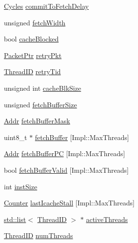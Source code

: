 \begin{DoxyCompactItemize}
\hyperlink{classCycles}{Cycles} \hyperlink{classDefaultFetch_a4b0344f5703ba5770b42602c6df63340}{commitToFetchDelay}
\item 
unsigned \hyperlink{classDefaultFetch_a89b5ed63a2dba82556b909f343319416}{fetchWidth}
\item 
bool \hyperlink{classDefaultFetch_a12a8dc8b9e94659a01ff979d9d98be89}{cacheBlocked}
\item 
\hyperlink{classPacket}{PacketPtr} \hyperlink{classDefaultFetch_a314ae93c04b3ca96e79e1b1f39a8e478}{retryPkt}
\item 
\hyperlink{base_2types_8hh_ab39b1a4f9dad884694c7a74ed69e6a6b}{ThreadID} \hyperlink{classDefaultFetch_a865aaad70625f17392c717930860d386}{retryTid}
\item 
unsigned int \hyperlink{classDefaultFetch_a37c69cb65c303fc6e66984fef13f18c6}{cacheBlkSize}
\item 
unsigned \hyperlink{classDefaultFetch_ac47806923c3481b83636c4aa03d184f8}{fetchBufferSize}
\item 
\hyperlink{base_2types_8hh_af1bb03d6a4ee096394a6749f0a169232}{Addr} \hyperlink{classDefaultFetch_a9fb9a70efc5e29795473f1f92c082063}{fetchBufferMask}
\item 
uint8\_\-t $\ast$ \hyperlink{classDefaultFetch_a924f2775385b2e5ac3008db4b8305c2b}{fetchBuffer} \mbox{[}Impl::MaxThreads\mbox{]}
\item 
\hyperlink{base_2types_8hh_af1bb03d6a4ee096394a6749f0a169232}{Addr} \hyperlink{classDefaultFetch_ab4b128217e67bdf9f6a98420b82cacb9}{fetchBufferPC} \mbox{[}Impl::MaxThreads\mbox{]}
\item 
bool \hyperlink{classDefaultFetch_ab6845c7b94805ded9ea7d94b210be51b}{fetchBufferValid} \mbox{[}Impl::MaxThreads\mbox{]}
\item 
int \hyperlink{classDefaultFetch_a494a9a986bc62c946604f9e9047ad237}{instSize}
\item 
\hyperlink{base_2types_8hh_ae1475755791765b8e6f6a8bb091e273e}{Counter} \hyperlink{classDefaultFetch_a1848d938e5258a2a79298169e43efde5}{lastIcacheStall} \mbox{[}Impl::MaxThreads\mbox{]}
\item 
\hyperlink{classstd_1_1list}{std::list}$<$ \hyperlink{base_2types_8hh_ab39b1a4f9dad884694c7a74ed69e6a6b}{ThreadID} $>$ $\ast$ \hyperlink{classDefaultFetch_af6eaea53db532812052f71bf0380dab5}{activeThreads}
\item 
\hyperlink{base_2types_8hh_ab39b1a4f9dad884694c7a74ed69e6a6b}{ThreadID} \hyperlink{classDefaultFetch_a88377f855dbf5adeeecb06b5bb821d35}{numThreads}
\item 

\end{DoxyCompactItemize}
